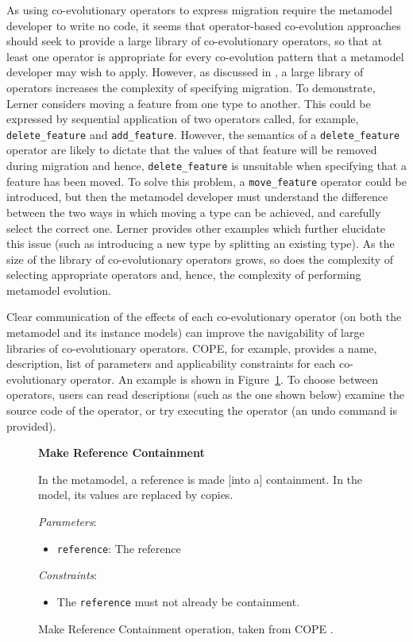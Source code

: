 As using co-evolutionary operators to express migration require the metamodel developer to write no code, it seems that operator-based co-evolution approaches should seek to provide a large library of co-evolutionary operators, so that at least one operator is appropriate for every co-evolution pattern that a metamodel developer may wish to apply. However, as discussed in \cite{lerner00model}, a large library of operators increases the complexity of specifying migration. To demonstrate, Lerner considers moving a feature from one type to another. This could be expressed by sequential application of two operators called, for example, \texttt{delete\_feature} and \texttt{add\_feature}. However, the semantics of a \texttt{delete\_feature} operator are likely to dictate that the  values of that feature will be removed during migration and hence, \texttt{delete\_feature} is unsuitable when specifying that a feature has been moved. To solve this problem, a \texttt{move\_feature} operator could be introduced, but then the metamodel developer must understand the difference between the two ways in which moving a type can be achieved, and carefully select the correct one. Lerner provides other examples which further elucidate this issue (such as introducing a new type by splitting an existing type). As the size of the library of co-evolutionary operators grows, so does the complexity of selecting appropriate operators and, hence, the complexity of performing metamodel evolution.

Clear communication of the effects of each co-evolutionary operator (on both the metamodel and its instance models) can improve the navigability of large libraries of co-evolutionary operators. COPE, for example, provides a name, description, list of parameters and applicability constraints for each co-evolutionary operator. An example is shown in Figure~\ref{fig:cope_op}. To choose between operators, users can read descriptions (such as the one shown below) examine the source code of the operator, or try executing the operator (an undo command is provided).


\begin{figure}[htbp]
	\begin{framed}
		\textbf{Make Reference Containment}

		In the metamodel, a reference is made [into a] containment. In the model, its values are replaced by copies.


		\emph{Parameters}:
		\begin{itemize}
			\item \texttt{reference}: The reference
		\end{itemize}

		\emph{Constraints}:
		\begin{itemize}
			\item The \texttt{reference} must not already be containment.
		\end{itemize}
	\end{framed}
	\caption[COPE's Make Reference Containment operation.]{Make Reference Containment operation, taken from COPE \cite{herrmannsdoerfer09cope}.}
\label{fig:cope_op}
\end{figure}

